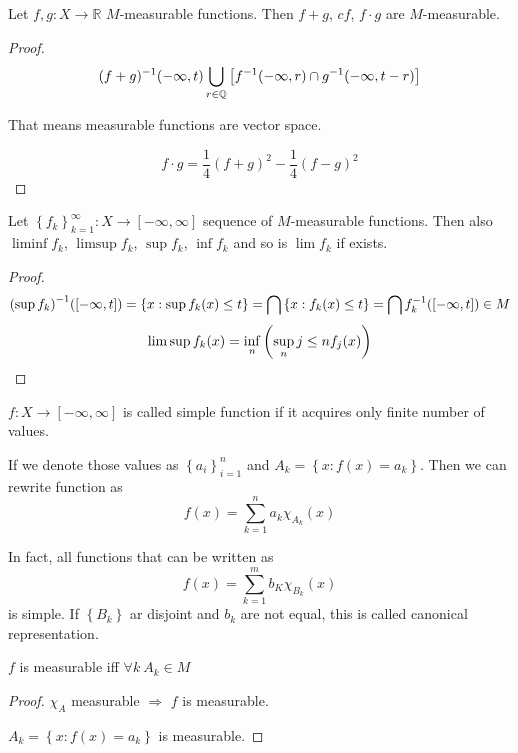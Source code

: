 \begin{theorem}
	Let $f,g : X \to \mathbb{R}$ $M$-measurable functions. Then
	$f+g$, $cf$, $f\cdot g$ are $M$-measurable.
	\begin{proof}
		$$(f+g)^{-1}(-\infty,t) \bigcup_{r\in \mathbb{Q}} \qty[f^{-1}(-\infty, r) \cap g^{-1} (-\infty, t-r)]$$
		
		That means measurable functions are vector space.
		
		$$f\cdot g = \frac{1}{4} (f+g)^2 - \frac{1}{4} (f-g)^2$$
	\end{proof}
\end{theorem}

\begin{theorem}
	Let $\left\{ f_k\right\}_{k=1}^\infty: X \to [-\infty, \infty]$ sequence of $M$-measurable functions. Then also 
	$\liminf f_k$, $\limsup f_k$, $\sup f_k$, $\inf f_k$ and so is $\lim f_k$ if exists.
	\begin{proof}
		$$\qty(\sup f_k)^{-1} ([-\infty, t]) = \left\{ x: \sup f_k(x) \leq t \right\} = \bigcap \left\{ x: f_k(x) \leq t \right\} = \bigcap f^{-1}_k ([-\infty, t]) \in M$$
		$$\limsup f_k(x) = \inf\limits_n \qty(\sup\limits_n{j\leq n} f_j(x)) $$
	\end{proof}
\end{theorem}

\begin{definition}
	$f: X \to [-\infty, \infty]$ is called simple function if it acquires only finite number of values.
	
	If we denote those values as $\left\{ a_i \right\}_{i=1}^n$ and $A_k = \left\{ x: f(x) = a_k \right\}$. Then we can rewrite function as
	$$f(x) = \sum_{k=1}^na_k \chi_{A_k}(x)$$
	
	In fact, all  functions that can be written as
	$$f(x) = \sum_{k=1}^m b_K \chi_{B_k}(x)$$
	is simple. If $\left\{ B_k\right\}$ ar disjoint and $b_k$ are not equal, this is called canonical representation.
\end{definition}

\begin{prop}
	$f$ is measurable iff $\forall k \: A_k \in M$
	\begin{proof}
		$\chi_A$ measurable $\Rightarrow$ $f$ is measurable.
		
		$A_k = \left\{ x: f(x) = a_k \right\}$ is measurable.
	\end{proof}
\end{prop}

